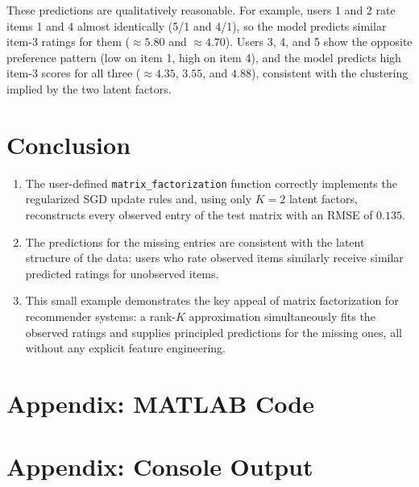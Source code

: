 \documentclass[12pt]{article}
\begin{document}
	These predictions are qualitatively reasonable. For example, users 1 and 2 rate items 1 and 4 almost identically (5/1 and 4/1), so the model predicts similar item-3 ratings for them ($\approx 5.80$ and $\approx 4.70$). Users 3, 4, and 5 show the opposite preference pattern (low on item 1, high on item 4), and the model predicts high item-3 scores for all three ($\approx 4.35$, $3.55$, and $4.88$), consistent with the clustering implied by the two latent factors.

	\newpage
	\section{Conclusion}

	\begin{enumerate}
		\item The user-defined \texttt{matrix\_factorization} function correctly implements the regularized SGD update rules and, using only $K = 2$ latent factors, reconstructs every observed entry of the test matrix with an RMSE of $0.135$.

		\item The predictions for the missing entries are consistent with the latent structure of the data: users who rate observed items similarly receive similar predicted ratings for unobserved items.

		\item This small example demonstrates the key appeal of matrix factorization for recommender systems: a rank-$K$ approximation simultaneously fits the observed ratings and supplies principled predictions for the missing ones, all without any explicit feature engineering.
	\end{enumerate}

	\newpage
	\section{Appendix: MATLAB Code}

	

	\newpage
	\vspace{1em}

	

	\newpage
	\section{Appendix: Console Output}

	
\end{document}
